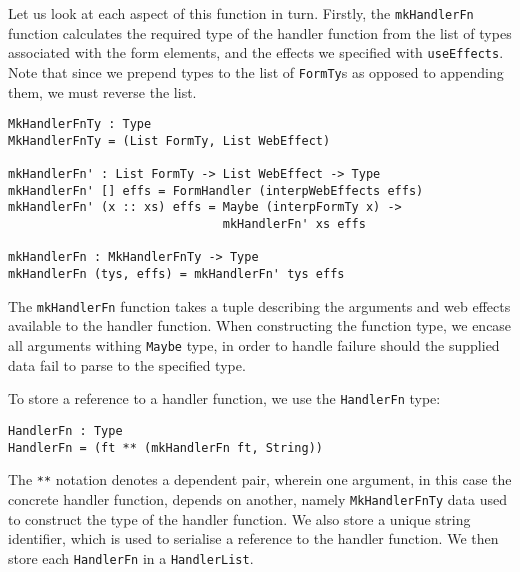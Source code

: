 \documentclass[preprint]{sigplanconf}
\begin{document}
Let us look at each aspect of this function in turn. Firstly, the \texttt{mkHandlerFn} function calculates the required type of the handler function from the list of types associated with the form elements, and the effects we specified with \texttt{useEffects}. Note that since we prepend types to the list of \texttt{FormTy}s as opposed to appending them, we must reverse the list.
\begin{Verbatim}
MkHandlerFnTy : Type
MkHandlerFnTy = (List FormTy, List WebEffect)

mkHandlerFn' : List FormTy -> List WebEffect -> Type
mkHandlerFn' [] effs = FormHandler (interpWebEffects effs) 
mkHandlerFn' (x :: xs) effs = Maybe (interpFormTy x) -> 
                              mkHandlerFn' xs effs 

mkHandlerFn : MkHandlerFnTy -> Type 
mkHandlerFn (tys, effs) = mkHandlerFn' tys effs 
\end{Verbatim}
The \texttt{mkHandlerFn} function takes a tuple describing the arguments and web effects available to the handler function. When constructing the function type, we encase all arguments withing \texttt{Maybe} type, in order to handle failure should the supplied data fail to parse to the specified type.

To store a reference to a handler function, we use the \texttt{HandlerFn} type:
\begin{Verbatim}
HandlerFn : Type
HandlerFn = (ft ** (mkHandlerFn ft, String))
\end{Verbatim}
%
The \texttt{**} notation denotes a dependent pair, wherein one argument, in this case the concrete handler function, depends on another, namely \texttt{MkHandlerFnTy} data used to construct the type of the handler function. We also store a unique string identifier, which is used to serialise a reference to the handler function. We then store each \texttt{HandlerFn} in a \texttt{HandlerList}.
\end{document}

